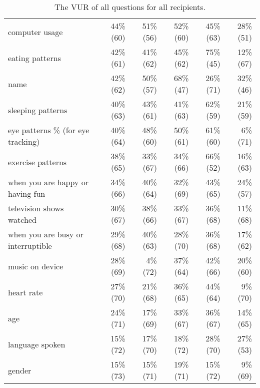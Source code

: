 \begin{table*}[t]
\begin{center}
\begin{tabular}{| l | r | r | r | r | r |}
computer usage& 44\% (60) & 51\% (56) & 52\% (60) & 45\% (63) & 28\% (51) \\ 
eating patterns & 42\% (61) & 41\% (62) & 45\% (62) & 75\% (45) & 12\% (67) \\ 
name & 42\% (62) & 50\% (57) & 68\% (47) & 26\% (71) & 32\% (46) \\ 
sleeping patterns & 40\% (63) & 43\% (61) & 41\% (63) & 62\% (59) & 21\% (59) \\ 
eye patterns \% (for eye tracking) & 40\% (64) & 48\% (60) & 50\% (61) & 61\% (60) & 6\% (71) \\ 
exercise patterns & 38\% (65) & 33\% (67) & 34\% (66) & 66\% (52) & 16\% (63) \\ 
when you are happy or having fun & 34\% (66) & 40\% (64) & 32\% (69) & 43\% (65) & 24\% (57) \\ 
television shows watched & 30\% (67) & 38\% (66) & 33\% (67) & 36\% (68) & 11\% (68) \\ 
when you are busy or interruptible & 29\% (68) & 40\% (63) & 28\% (70) & 36\% (68) & 17\% (62) \\ 
music on device & 28\% (69) & 4\% (72) & 37\% (64) & 42\% (66) & 20\% (60) \\ 
heart rate & 27\% (70) & 21\% (68) & 36\% (65) & 44\% (64) & 9\% (70) \\ 
age & 24\% (71) & 17\% (69) & 33\% (67) & 36\% (67) & 14\% (65) \\ 
language spoken & 15\% (72) & 17\% (70) & 18\% (72) & 28\% (70) & 27\% (53) \\ 
gender & 15\% (73) & 15\% (71) & 19\% (71) & 15\% (72) & 9\% (69) \\ 
\hline
\end{tabular}
\caption{The VUR of all questions for all recipients.}
\label{all-vur}
\end{center}
\end{table*}